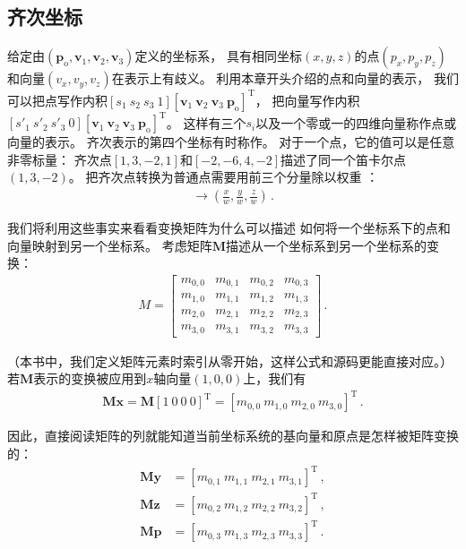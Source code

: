 \subsection{齐次坐标}\label{sub:齐次坐标}
给定由$(\bm p_\mathrm{o},\bm v_1,\bm v_2,\bm v_3)$定义的坐标系，
具有相同坐标$(x,y,z)$的点$(p_x,p_y,p_z)$和向量$(v_x,v_y,v_z)$在表示上有歧义。
利用本章开头介绍的点和向量的表示，
我们可以把点写作内积$[s_1\ s_2\ s_3\ 1][\bm v_1\ \bm v_2\ \bm v_3\ \bm p_\mathrm{o}]^\mathrm{T}$，
把向量写作内积$[s'_1\ s'_2\ s'_3\ 0][\bm v_1\ \bm v_2\ \bm v_3\ \bm p_\mathrm{o}]^\mathrm{T}$。
这样有三个$s_i$以及一个零或一的四维向量称作点或向量的表示。
齐次表示的第四个坐标有时称作。
对于一个点，它的值可以是任意非零标量：
齐次点$[1,3,-2,1]$和$[-2,-6,4,-2]$描述了同一个笛卡尔点$(1,3,-2)$。
把齐次点转换为普通点需要用前三个分量除以权重
：
\begin{align*}
    [x,y,z,w]\rightarrow\left(\frac{x}{w},\frac{y}{w},\frac{z}{w}\right)\, .
\end{align*}

我们将利用这些事实来看看变换矩阵为什么可以描述
如何将一个坐标系下的点和向量映射到另一个坐标系。
考虑矩阵$\bm M$描述从一个坐标系到另一个坐标系的变换：
\begin{align*}
    M=\left[
        \begin{array}{cccc}
            m_{0,0} & m_{0,1} & m_{0,2} & m_{0,3} \\
            m_{1,0} & m_{1,1} & m_{1,2} & m_{1,3} \\
            m_{2,0} & m_{2,1} & m_{2,2} & m_{2,3} \\
            m_{3,0} & m_{3,1} & m_{3,2} & m_{3,3}
        \end{array}
        \right]\, .
\end{align*}

（本书中，我们定义矩阵元素时索引从零开始，这样公式和源码更能直接对应。）
若$\bm M$表示的变换被应用到$x$轴向量$(1,0,0)$上，我们有
\begin{align*}
    \bm M\bm x=\bm M[1\ 0\ 0\ 0]^\mathrm{T}=[m_{0,0}\ m_{1,0}\ m_{2,0}\ m_{3,0}]^\mathrm{T}\, .
\end{align*}

因此，直接阅读矩阵的列就能知道当前坐标系统的基向量和原点是怎样被矩阵变换的：
\begin{align*}
    \bm M\bm y & =[m_{0,1}\ m_{1,1}\ m_{2,1}\ m_{3,1}]^\mathrm{T}\, , \\
    \bm M\bm z & =[m_{0,2}\ m_{1,2}\ m_{2,2}\ m_{3,2}]^\mathrm{T}\, , \\
    \bm M\bm p & =[m_{0,3}\ m_{1,3}\ m_{2,3}\ m_{3,3}]^\mathrm{T}\, .
\end{align*}

